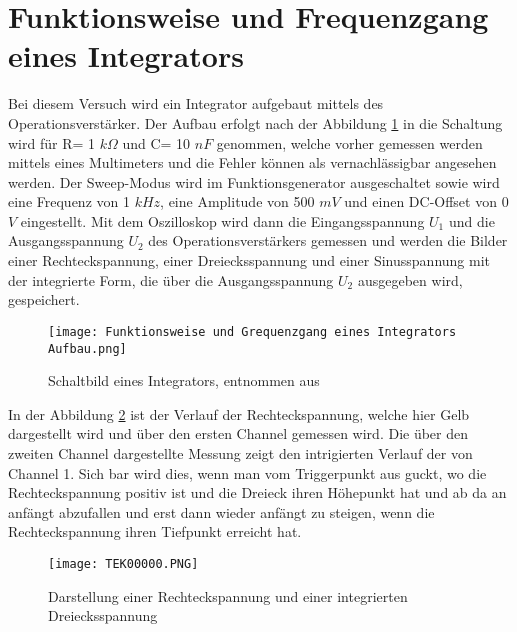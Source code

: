 \section{Funktionsweise und Frequenzgang eines Integrators}
Bei diesem Versuch wird ein Integrator aufgebaut mittels des Operationsverstärker. Der Aufbau erfolgt nach der Abbildung \ref{fig:Versuch2/Schaltbild eines Integrators} in die Schaltung wird für R= 1 $k \Omega$ und C= 10 $nF$ genommen, welche vorher gemessen werden mittels eines Multimeters und die Fehler können als vernachlässigbar angesehen werden. Der Sweep-Modus wird im Funktionsgenerator ausgeschaltet sowie wird eine Frequenz von 1 $kHz$, eine Amplitude von 500 $mV$ und einen DC-Offset von 0 $V$ eingestellt. Mit dem Oszilloskop wird dann die Eingangsspannung $U_1$ und die Ausgangsspannung $U_2$ des Operationsverstärkers gemessen und werden die Bilder einer Rechteckspannung, einer Dreiecksspannung und einer Sinusspannung mit der integrierte Form, die über die Ausgangsspannung $U_2$ ausgegeben wird, gespeichert.   
\begin{figure}[H]
    \centering
    \texttt{[image: Funktionsweise und Grequenzgang eines Integrators Aufbau.png]}
    \caption{Schaltbild eines Integrators, entnommen aus \cite{script}}
    \label{fig:Versuch2/Schaltbild eines Integrators}
\end{figure}
In der Abbildung \ref{fig:Versuch2/Darstellung einer Rechteckspannung und einer integrierten Dreiecksspannung} ist der Verlauf der Rechteckspannung, welche hier Gelb dargestellt wird und über den ersten Channel gemessen wird. Die über den zweiten Channel dargestellte Messung zeigt den intrigierten Verlauf der von Channel 1. Sich bar wird dies, wenn man vom Triggerpunkt aus guckt, wo die Rechteckspannung positiv ist und die Dreieck ihren Höhepunkt hat und ab da an anfängt abzufallen und erst dann wieder anfängt zu steigen, wenn die Rechteckspannung ihren Tiefpunkt erreicht hat. 
\begin{figure}[H]
    \centering
    \texttt{[image: TEK00000.PNG]}
    \caption{Darstellung einer Rechteckspannung und einer integrierten Dreiecksspannung}
    \label{fig:Versuch2/Darstellung einer Rechteckspannung und einer integrierten Dreiecksspannung}
\end{figure}

